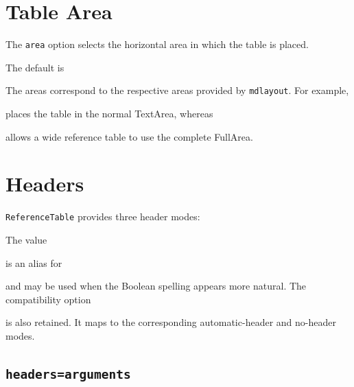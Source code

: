 \documentclass[
11pt,
a4paper,
oneside
]{scrbook}
\begin{document}



\section{Table Area}

The \texttt{area} option selects the horizontal area in which the table is
placed.




The default is




The areas correspond to the respective areas provided by \texttt{mdlayout}.
For example,




places the table in the normal TextArea, whereas




allows a wide reference table to use the complete FullArea.

\section{Headers}

\texttt{ReferenceTable} provides three header modes:




The value




is an alias for




and may be used when the Boolean spelling appears more natural.
The compatibility option




is also retained. It maps to the corresponding automatic-header and
no-header modes.

\subsection{\texttt{headers=arguments}}
\end{document}
